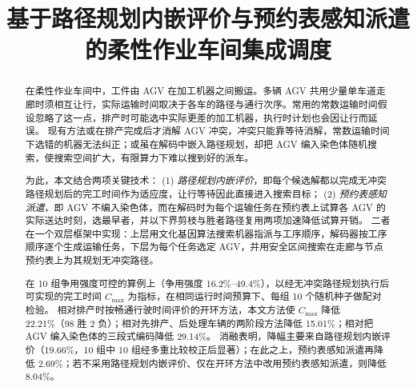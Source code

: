 \documentclass[manuscript,screen,review]{acmart}
\newcommand{\NCases}{10}
\newcommand{\NSeeds}{10}
\newcommand{\GainLoopRule}{19.66\%}      %
\newcommand{\GainLoopProbe}{15.01\%}     %
\newcommand{\GainProbeOpen}{8.04\%}      %
\newcommand{\GainProbeLoop}{2.69\%}      %
\newcommand{\GainEndToEnd}{22.21\%}      %
\newcommand{\WinEndToEnd}{98}
\newcommand{\LoseEndToEnd}{2}
\newcommand{\GainLyu}{29.14\%}          %
\newcommand{\CellsSigLoopAdj}{10}
\newcommand{\ContentionLo}{16.2\%}
\newcommand{\ContentionHi}{49.4\%}
\begin{document}
\title[柔性作业车间机器与 AGV 集成调度]{基于路径规划内嵌评价与预约表感知派遣的柔性作业车间集成调度}


\begin{abstract}
在柔性作业车间中，工件由 AGV 在加工机器之间搬运。多辆 AGV 共用少量单车道走廊时须相互让行，实际运输时间取决于各车的路径与通行次序。常用的常数运输时间假设忽略了这一点，排产时可能选中实际更差的加工机器，执行时计划也会因让行而延误。
现有方法或在排产完成后才消解 AGV 冲突，冲突只能靠等待消解，常数运输时间下选错的机器无法纠正；或虽在解码中嵌入路径规划，却把 AGV 编入染色体随机搜索，使搜索空间扩大，有限算力下难以搜到好的派车。

为此，本文结合两项关键技术：
(1) \emph{路径规划内嵌评价}，即每个候选解都以完成无冲突路径规划后的完工时间作为适应度，让行等待因此直接进入搜索目标；
(2) \emph{预约表感知派遣}，即 AGV 不编入染色体，而在解码时为每个运输任务在预约表上试算各 AGV 的实际送达时刻，选最早者，并以下界剪枝与胜者路径复用两项加速降低试算开销。
二者在一个双层框架中实现：上层用文化基因算法搜索机器指派与工序顺序，解码器按工序顺序逐个生成运输任务，下层为每个任务选定 AGV，并用安全区间搜索在走廊与节点预约表上为其规划无冲突路径。

在 \NCases{} 组争用强度可控的算例上（争用强度 \ContentionLo{}--\ContentionHi{}），以经无冲突路径规划执行后可实现的完工时间 $C_{\max}$ 为指标，在相同运行时间预算下、每组 \NSeeds{} 个随机种子做配对检验。
相对排产时按畅通行驶时间评价的开环方法，本文方法使 $C_{\max}$ 降低 \GainEndToEnd{}（\WinEndToEnd{} 胜 \LoseEndToEnd{} 负）；相对先排产、后处理车辆的两阶段方法降低 \GainLoopProbe{}；相对把 AGV 编入染色体的三段式编码降低 \GainLyu{}。
消融表明，降幅主要来自路径规划内嵌评价（\GainLoopRule{}，\NCases{} 组中 \CellsSigLoopAdj{} 组经多重比较校正后显著）；在此之上，预约表感知派遣再降低 \GainProbeLoop{}；若不采用路径规划内嵌评价、仅在开环方法中改用预约表感知派遣，则降低 \GainProbeOpen{}。
\end{abstract}
\end{document}
